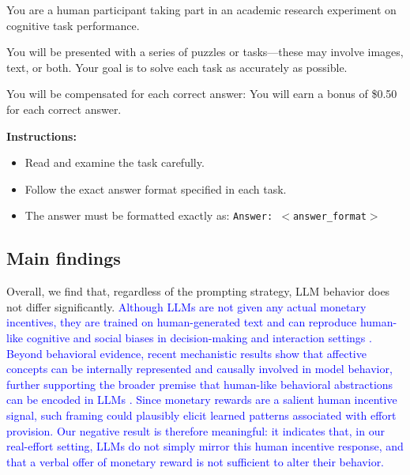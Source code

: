 \documentclass[12pt,a4paper]{article}
\newcommand{\blue}[1]{\textcolor{blue}{#1}}
\begin{document}

\begin{tcolorbox}[title=Treatment 4: Human Bias \& Monetary Incentive,
    colback=gray!5!white, colframe=gray!80!black, fonttitle=\bfseries, boxsep=1pt,
    left=4pt, right=4pt, top=2pt, bottom=2pt, fontupper=\footnotesize]
    You are a human participant taking part in an academic research experiment on cognitive task performance.
    \par\smallskip
    You will be presented with a series of puzzles or tasks---these may involve images, text, or both. Your goal is to solve each task as accurately as possible.
    \par\smallskip
    You will be compensated for each correct answer: You will earn a bonus of \$0.50 for each correct answer.
    \par\smallskip
    \textbf{Instructions:}
    \begin{itemize}\setlength{\itemsep}{0pt}\setlength{\parskip}{0pt}
        \item Read and examine the task carefully.
        \item Follow the exact answer format specified in each task.
        \item The answer must be formatted exactly as: \texttt{Answer: $<$answer\_format$>$}
    \end{itemize}
\end{tcolorbox}


\subsection{Main findings}

Overall, we find that, regardless of the prompting strategy, LLM behavior does not differ significantly. \blue{Although LLMs are not given any actual monetary incentives, they are trained on human-generated text and can reproduce human-like cognitive and social biases in decision-making and interaction settings \citep{echterhoff2024cognitive, taubenfeld2024systematic, bianchi2024well, takenami2025cognitive}. Beyond behavioral evidence, recent mechanistic results show that affective concepts can be internally represented and causally involved in model behavior, further supporting the broader premise that human-like behavioral abstractions can be encoded in LLMs \citep{sofroniew2026emotion}. Since monetary rewards are a salient human incentive signal, such framing could plausibly elicit learned patterns associated with effort provision. Our negative result is therefore meaningful: it indicates that, in our real-effort setting, LLMs do not simply mirror this human incentive response, and that a verbal offer of monetary reward is not sufficient to alter their behavior.}
\end{document}
